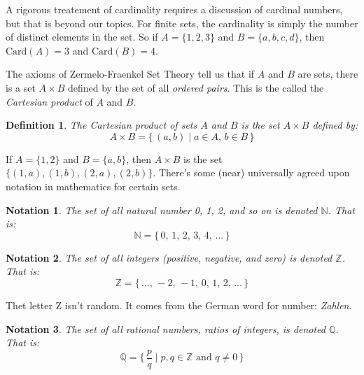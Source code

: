\documentclass{article}
\theoremstyle{plain}
\theoremstyle{normal}
\newtheorem{definition}{Definition}[section]
\newtheorem{notation}{Notation}[section]
\begin{document}
        A rigorous treatement of cardinality requires a discussion of cardinal
        numbers, but that is beyond our topics. For finite sets, the
        cardinality is simply the number of distinct elements in the set.
        So if $A=\{1,2,3\}$ and $B=\{a,b,c,d\}$, then
        $\textrm{Card}(A)=3$ and $\textrm{Card}(B)=4$.
        \par\hfill\par
        The axioms of Zermelo-Fraenkel Set Theory tell us that if $A$ and $B$
        are sets, there is a set $A\times{B}$ defined by the set of all
        \textit{ordered pairs}. This is the called the
        \textit{Cartesian product} of $A$ and $B$.
        \begin{definition}
            \label{def:cartesian_product}%
            The \textit{Cartesian product} of sets $A$ and $B$ is the set
            $A\times{B}$ defined by:
            \begin{equation}
                A\times{B}=\{\,(a,b)\;|\;a\in{A},\,b\in{B}\,\}
            \end{equation}
        \end{definition}
        If $A=\{1,2\}$ and $B=\{a,b\}$, then $A\times{B}$ is the set
        $\{(1,a),(1,b),(2,a),(2,b)\}$.
        There's some (near) universally agreed upon notation in mathematics for
        certain sets.
        \begin{notation}
            \label{not:natural_numbers}%
            The set of all natural number 0, 1, 2, and so on is denoted
            $\mathbb{N}$. That is:
            \begin{equation}
                \mathbb{N}=\{\,0,\,1,\,2,\,3,\,4,\,\dots\,\}
            \end{equation}
        \end{notation}
        \begin{notation}
            \label{not:integers}%
            The set of all integers (positive, negative, and zero) is denoted
            $\mathbb{Z}$. That is:
            \begin{equation}
                \mathbb{Z}=\{\,\dots,\,-2,\,-1,\,0,\,1,\,2,\,\dots\,\}
            \end{equation}
        \end{notation}
        Thet letter Z isn't random. It comes from the German word for number:
        \textit{Zahlen}.
        \begin{notation}
            \label{not:rationals}%
            The set of all rational numbers, ratios of integers, is denoted
            $\mathbb{Q}$. That is:
            \begin{equation}
                \mathbb{Q}=\{\,\frac{p}{q}\;|\;p,q\in\mathbb{Z}\textrm{ and }
                    q\ne{0}\,\}
            \end{equation}
        \end{notation}
\end{document}
